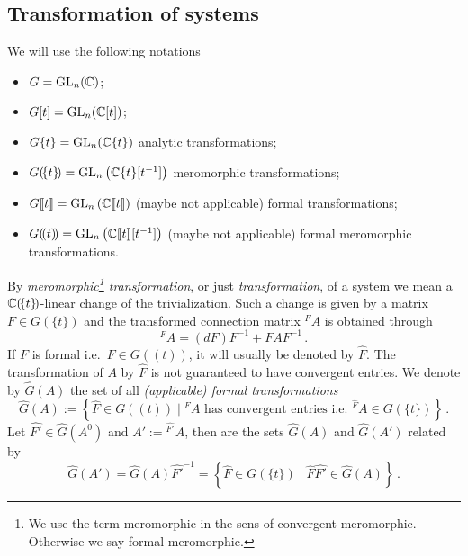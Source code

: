 \subsection{Transformation of systems}
\begin{notations}
  We will use the following notations
  \begin{itemize}
    \item $G=\operatorname{GL}_n(\mathbb{C})$;
    \item $G[t]=\operatorname{GL}_n(\mathbb{C}[t])$;
    \item $G\{t\}=\operatorname{GL}_n(\mathbb{C}\{t\})$ analytic transformations;
    \item $G(\!\{t\}\!)=\operatorname{GL}_n\left(\mathbb{C}\{t\}[t^{-1}]\right)$ meromorphic
      transformations;
    \item $G\llbracket t\rrbracket=\operatorname{GL}_n\left(\mathbb{C}\llbracket t\rrbracket\right)$
      (maybe not applicable) formal transformations;
    \item $G(\!(t)\!)=\operatorname{GL}_n\left(\mathbb{C}\llbracket t\rrbracket[t^{-1}]\right)$
      (maybe not applicable) formal meromorphic transformations.
  \end{itemize}
  \begin{comment}
    We will always use the meromorphic ones, in contrast
    to~\cite{boalch,thboalch} where analytic classification is used.
  \end{comment}
\end{notations}
By \emph{meromorphic\footnote{We use the term meromorphic in the sens of
convergent meromorphic. Otherwise we say formal meromorphic.} transformation},
or just \emph{transformation}, of a system we mean a $\mathbb{C}(\!\{t\}\!)$-linear
change of the trivialization.
Such a change is given by a matrix $F\in G(\!\{t\}\!)$ and the transformed
connection matrix ${}^F\!A$ is obtained through
\[
  {}^F\!A=(dF)F^{-1} + FAF^{-1} \,.
\]
If $F$ is formal i.e.\ $F\in G(\!(t)\!)$, it will usually be denoted by
$\hat F$.
The transformation of $A$ by $\hat F$ is not guaranteed to have convergent
entries.
We denote by $\hat G(A)$ the set of all \emph{(applicable) formal
transformations}
\[
  \hat G(A):=\left\{\hat F\in G(\!(t)\!)
    \mid {}^{\hat F}\!A \text{ has convergent entries i.e.\ }
    {}^{\hat F}\!A\in G(\!\{t\}\!)
  \right\}\,.
\]
Let $\hat{F'}\in\hat G(A^0)$ and $A':={}^{\hat{F'}}\!A$, then are the sets
$\hat G(A)$ and $\hat G(A')$ related by
\[
  \hat G(A')=\hat G(A)\hat{F'}^{-1}=\left\{
    \hat F\in G(\!\{t\}\!) \mid \hat F\hat{F'}\in\hat G(A)
  \right\} \,.
\]

